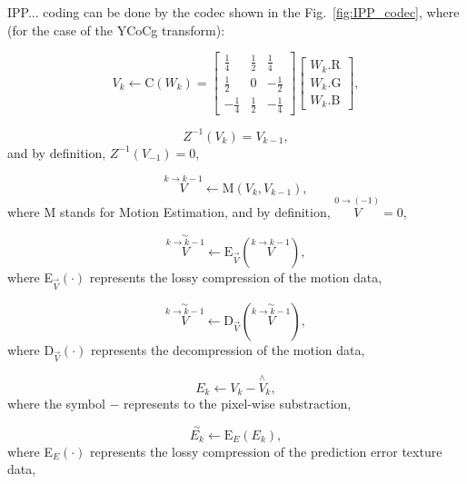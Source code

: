 IPP... coding can be done by the codec shown in the
Fig.~\ref{fig:IPP_codec}, where (for the case of the YCoCg transform):

\begin{equation}
  V_k \leftarrow \text{C}(W_k) =
  \begin{bmatrix}
    \frac{1}{4} &  \frac{1}{2}  &  \frac{1}{4} \\ 
    \frac{1}{2} &            0  & -\frac{1}{2} \\
    -\frac{1}{4} &  \frac{1}{2}  & -\frac{1}{4}
  \end{bmatrix}
  \begin{bmatrix}
    W_k.\text{R} \\
    W_k.\text{G} \\
    W_k.\text{B}
  \end{bmatrix}
  , \tag{a}
\end{equation}

\begin{equation}
  Z^{-1}(V_k) = V_{k-1},
  \tag{b}
\end{equation}
and by definition, $Z^{-1}(V_{-1}) = 0$,

\begin{equation}
  \overset{k\rightarrow k-1}{V} \leftarrow \text{M}(V_k, V_{k-1}),
  \tag{c}
\end{equation}
where M stands for Motion Estimation, and by definition,
$\overset{0\rightarrow (-1)}{V}=0$,

\begin{equation}
  \overset{\sim}{\overset{k\rightarrow k-1}{V}} \leftarrow \text{E}_{\overset{\rightarrow}{V}}(\overset{k\rightarrow k-1}{V}),
  \tag{d}
\end{equation}
where E$_{\overset{\rightarrow}{V}}(\cdot)$ represents the lossy
  compression of the motion data,

\begin{equation}
  \overset{\sim}{\overset{k\rightarrow k-1}{V}} \leftarrow \text{D}_{\overset{\rightarrow}{V}}(\overset{\sim}{\overset{k\rightarrow k-1}{V}}),
  \tag{e}
\end{equation}
where D$_{\overset{\rightarrow}{V}}(\cdot)$ represents the 
decompression of the motion data,

\begin{equation}
  E_k \leftarrow V_k - \overset{\wedge}{{V}}_k,
  \tag{f}
\end{equation}
where the symbol $-$ represents to the pixel-wise substraction,

\begin{equation}
  \overset{\sim}{E_k} \leftarrow \text{E}_{E}(E_k),
  \tag{g}
\end{equation}
where E$_{E}(\cdot)$ represents the lossy compression of the
prediction error texture data,

